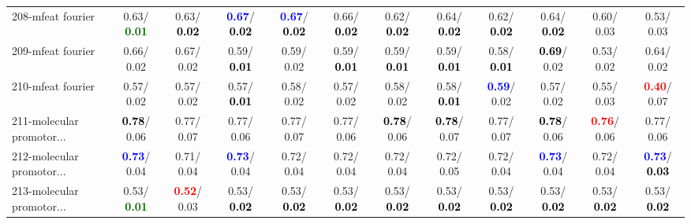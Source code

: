 \begin{table}[h]
\begin{center}
{\begin{tabular}{lc|c|c|c|c|c|c|c|c|c|c}
208-mfeat fourier &   0.63/\textcolor{darkgreen}{\textbf{  0.01}} &   0.63/\textcolor{black}{\textbf{  0.02}} & \textcolor{blue}{\textbf{  0.67}}/\textcolor{black}{\textbf{  0.02}} & \textcolor{blue}{\textbf{  0.67}}/\textcolor{black}{\textbf{  0.02}} &   0.66/\textcolor{black}{\textbf{  0.02}} &   0.62/\textcolor{black}{\textbf{  0.02}} &   0.64/\textcolor{black}{\textbf{  0.02}} &   0.62/\textcolor{black}{\textbf{  0.02}} &   0.64/\textcolor{black}{\textbf{  0.02}} &   0.60/  0.03 &   0.53/  0.03 \\
209-mfeat fourier &   0.66/  0.02 &   0.67/  0.02 &   0.59/\textcolor{black}{\textbf{  0.01}} &   0.59/  0.02 &   0.59/\textcolor{black}{\textbf{  0.01}} &   0.59/\textcolor{black}{\textbf{  0.01}} &   0.59/\textcolor{black}{\textbf{  0.01}} &   0.58/\textcolor{black}{\textbf{  0.01}} & \textcolor{black}{\textbf{  0.69}}/  0.02 &   0.53/  0.02 &   0.64/  0.02 \\
210-mfeat fourier &   0.57/  0.02 &   0.57/  0.02 &   0.57/\textcolor{black}{\textbf{  0.01}} &   0.58/  0.02 &   0.57/  0.02 &   0.58/  0.02 &   0.58/\textcolor{black}{\textbf{  0.01}} & \textcolor{blue}{\textbf{  0.59}}/  0.02 &   0.57/  0.02 &   0.55/  0.03 & \textcolor{red}{\textbf{  0.40}}/  0.07 \\
211-molecular promotor... & \textcolor{black}{\textbf{  0.78}}/  0.06 &   0.77/  0.07 &   0.77/  0.06 &   0.77/  0.07 &   0.77/  0.06 & \textcolor{black}{\textbf{  0.78}}/  0.06 & \textcolor{black}{\textbf{  0.78}}/  0.07 &   0.77/  0.07 & \textcolor{black}{\textbf{  0.78}}/  0.06 & \textcolor{red}{\textbf{  0.76}}/  0.06 &   0.77/  0.06 \\
212-molecular promotor... & \textcolor{blue}{\textbf{  0.73}}/  0.04 &   0.71/  0.04 & \textcolor{blue}{\textbf{  0.73}}/  0.04 &   0.72/  0.04 &   0.72/  0.04 &   0.72/  0.04 &   0.72/  0.05 &   0.72/  0.04 & \textcolor{blue}{\textbf{  0.73}}/  0.04 &   0.72/  0.04 & \textcolor{blue}{\textbf{  0.73}}/\textcolor{black}{\textbf{  0.03}} \\
213-molecular promotor... &   0.53/\textcolor{darkgreen}{\textbf{  0.01}} & \textcolor{red}{\textbf{  0.52}}/  0.03 &   0.53/\textcolor{black}{\textbf{  0.02}} &   0.53/\textcolor{black}{\textbf{  0.02}} &   0.53/\textcolor{black}{\textbf{  0.02}} &   0.53/\textcolor{black}{\textbf{  0.02}} &   0.53/\textcolor{black}{\textbf{  0.02}} &   0.53/\textcolor{black}{\textbf{  0.02}} &   0.53/\textcolor{black}{\textbf{  0.02}} &   0.53/\textcolor{black}{\textbf{  0.02}} &   0.53/\textcolor{black}{\textbf{  0.02}} \\ \hline

\end{tabular}}
\end{center}
\end{table}
